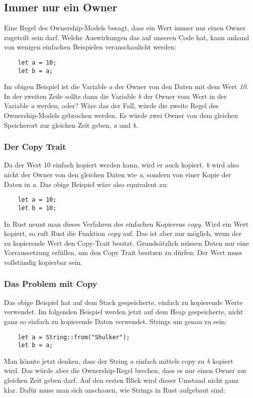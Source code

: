 \subsection{Immer nur ein Owner}
Eine Regel des Ownership-Models besagt, dass ein Wert immer nur einen Owner zugeteilt sein darf. Welche Auswirkungen das auf unseren Code hat, kann anhand
von wenigen einfachen Beispielen veranschaulicht werden:
\begin{lstlisting}
    let a = 10;
    let b = a;
\end{lstlisting}
Im obigen Beispiel ist die Variable \textit{a} der Owner von den Daten mit dem Wert \textit{10}. In der zweiten Zeile sollte dann die Variable \textit{b}
der Owner vom Wert in der Variable \textit{a} werden, oder? Wäre das der Fall, würde die zweite Regel des Ownership-Models gebrochen werden. Es würde zwei
Owner von dem gleichen Speicherort zur gleichen Zeit geben, \textit{a} und \textit{b}.

\subsubsection{Der Copy Trait}
Da der Wert 10 einfach kopiert werden kann, wird er auch kopiert. \textit{b} wird also nicht der Owner von den gleichen Daten wie \textit{a}, sondern
von einer Kopie der Daten in \textit{a}. Das obige Beispiel wäre also equivalent zu:
\begin{lstlisting}
    let a = 10;
    let b = 10;
\end{lstlisting}
In Rust nennt man dieses Verfahren des einfachen Kopierens \textit{copy}. Wird ein Wert kopiert, so ruft Rust die Funktion \textit{copy} auf. Das
ist aber nur möglich, wenn der zu kopierende Wert den Copy-Trait besitzt. Grundsätzlich müssen Daten nur eine Vorraussetzung erfüllen, um den
Copy Trait besitzen zu dürfen: Der Wert muss vollständig kopierbar sein.

\subsubsection{Das Problem mit Copy}
Das obige Beispiel hat auf dem Stack gespeicherte, einfach zu kopierende Werte verwendet. Im folgenden Beispiel werden jetzt auf dem Heap gespeicherte,
nicht ganz so einfach zu kopierende Daten verwendet. Strings um genau zu sein:
\begin{lstlisting}
    let a = String::from("Shulker");
    let b = a;
\end{lstlisting}
Man könnte jetzt denken, dass der String \textit{a} einfach mittels copy zu \textit{b} kopiert wird. Das würde aber die Ownership-Regel brechen, dass
es nur einen Owner zur gleichen Zeit geben darf. Auf den ersten Blick wird dieser Umstand nicht ganz klar. Dafür muss man sich anschauen, wie Strings
in Rust aufgebaut sind:
